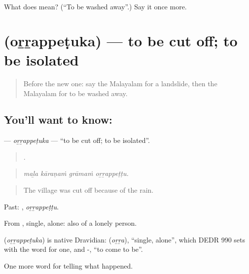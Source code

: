 \begin{tcolorbox}[breakable,colback=teal!4,colframe=teal!35!black,title={Before you move on}]
What does  mean? (\textquotedblleft{}To be washed away\textquotedblright{}.) Say it once more.
\end{tcolorbox}
\section[\texorpdfstring{\ml{ഒറ്റപ്പെടുക} (oṟṟappeṭuka)}{ഒറ്റപ്പെടുക (oṟṟappeṭuka)}]{ (oṟṟappeṭuka) — to be cut off; to be isolated}

\label{lesson:ML-C377-orrappetuka}



\begin{quote}
Before the new one: say the Malayalam for a landslide, then the Malayalam for to be washed away.
\end{quote}

\subsection*{You'll want to know: }
\textbf{} — \emph{oṟṟappeṭuka} — \textquotedblleft{}to be cut off; to be isolated\textquotedblright{}.

\begin{quote}
   .
\end{quote}

\begin{quote}
\emph{maḻa kāraṇaṁ grāmaṁ oṟṟappeṭṭu.}
\end{quote}

\begin{quote}
The village was cut off because of the rain.
\end{quote}

Past: , \emph{oṟṟappeṭṭu}.

From , single, alone: also of a lonely person.

\begin{cousinweb}
\textbf{} (\emph{oṟṟappeṭuka}) is native Dravidian:  (\emph{oṟṟa}), \textquotedblleft{}single, alone\textquotedblright{}, which DEDR 990 sets with the word for one, and -, \textquotedblleft{}to come to be\textquotedblright{}.
\end{cousinweb}

\begin{grammarlens}[title={What you've built}]
One more word for telling what happened.
\end{grammarlens}

